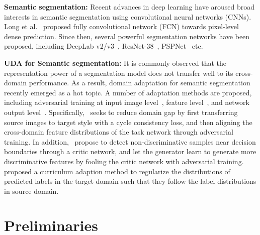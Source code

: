 \documentclass[runningheads]{llncs}
\begin{document}
\noindent\textbf{Semantic segmentation:} Recent advances in deep learning have aroused broad interests in semantic segmentation using convolutional neural networks (CNNs). Long et al.~\cite{long2015fully} proposed fully convolutional network (FCN) towards pixel-level dense prediction. Since then, several powerful segmentation networks have been proposed, including DeepLab v2/v3~\cite{chen2018deeplab, chen2017rethinking}, ResNet-38~\cite{wu2016wider}, PSPNet~\cite{Zhao_2017_CVPR} etc.

\noindent\textbf{UDA for Semantic segmentation:} It is commonly observed that the representation power of a segmentation model does not transfer well to its cross-domain performance. As a result, domain adaptation for semantic segmentation recently emerged as a hot topic. A number of adaptation methods are proposed, including adversarial training at input image level~\cite{hoffman2018cycada}, feature level~\cite{hoffman2016fcns,Chen_2017_ICCV,hoffman2018cycada}, and network output level~\cite{tsai2018learning}. Specifically,~\cite{hoffman2018cycada} seeks to reduce domain gap by first transferring source images to target style with a cycle consistency loss, and then aligning the cross-domain feature distributions of the task network through adversarial training. In addition,~\cite{saito2017adversarial} propose to detect non-discriminative samples near decision boundaries through a critic network, and let the generator learn to generate more discriminative features by fooling the critic network with adversarial training. \cite{Zhang_2017_ICCV} proposed a curriculum adaption method to regularize the distributions of predicted labels in the target domain such that they follow the label distributions in source domain. 



\section{Preliminaries}
\end{document}
